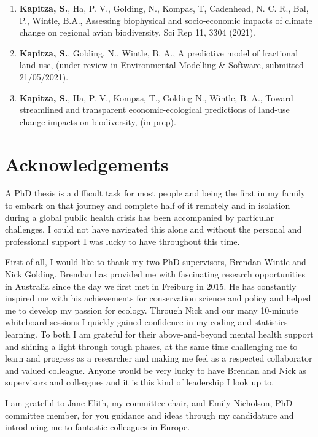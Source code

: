 \documentclass[titlesmallcaps,copyrightpage]{uomthesis}\usepackage[]{graphicx}\usepackage[]{color}
\begin{document}
\begin{enumerate}
  \item{\textbf{Kapitza, S.}, Ha, P. V., Golding, N., Kompas, T, Cadenhead, N. C. R., Bal, P., Wintle, B.A., Assessing biophysical and socio-economic impacts of climate change on regional avian biodiversity. Sci Rep 11, 3304 (2021).}
  \item{\textbf{Kapitza, S.}, Golding, N., Wintle, B. A., A predictive model of fractional land use, (under review in Environmental Modelling \& Software, submitted 21/05/2021).}
  \item{\textbf{Kapitza, S.}, Ha, P. V., Kompas, T., Golding N., Wintle, B. A., Toward streamlined and transparent economic-ecological predictions of land-use change impacts on biodiversity, (in prep).}
  \end{enumerate}
  
\clearpage{\pagestyle{empty}\cleardoublepage}

\chapter{Acknowledgements}
A PhD thesis is a difficult task for most people and being the first in my family to embark on that journey and complete half of it remotely and in isolation during a global public health crisis has been accompanied by particular challenges. I could not have navigated this alone and without the personal and professional support I was lucky to have throughout this time.

First of all, I would like to thank my two PhD supervisors, Brendan Wintle and Nick Golding. Brendan has provided me with fascinating research opportunities in Australia since the day we first met in Freiburg in 2015. He has constantly inspired me with his achievements for conservation science and policy and helped me to develop my passion for ecology. Through Nick and our many 10-minute whiteboard sessions I quickly gained confidence in my coding and statistics learning. To both I am grateful for their above-and-beyond mental health support and shining a light through tough phases, at the same time challenging me to learn and progress as a researcher and making me feel as a respected collaborator and valued colleague. Anyone would be very lucky to have Brendan and Nick as supervisors and colleagues and it is this kind of leadership I look up to.

I am grateful to Jane Elith, my committee chair, and Emily Nicholson, PhD committee member, for you guidance and ideas through my candidature and introducing me to fantastic colleagues in Europe.
\end{document}
